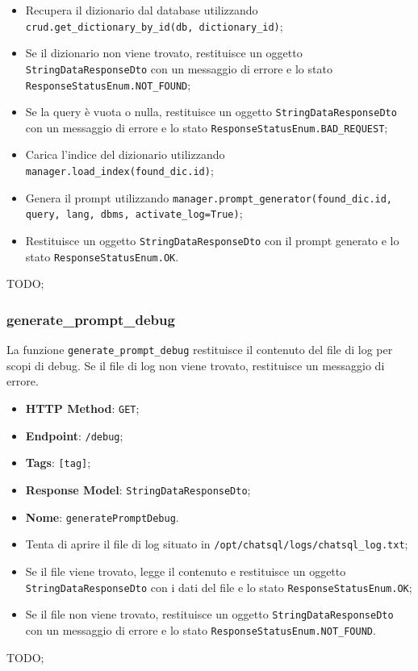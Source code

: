 \begin{itemize}
 \item Recupera il dizionario dal database utilizzando \texttt{crud.get\_dictionary\_by\_id(db, dictionary\_id)};
 \item Se il dizionario non viene trovato, restituisce un oggetto \texttt{StringDataResponseDto} con un messaggio di errore e lo stato \texttt{ResponseStatusEnum.NOT\_FOUND};
 \item Se la query è vuota o nulla, restituisce un oggetto \texttt{StringDataResponseDto} con un messaggio di errore e lo stato \texttt{ResponseStatusEnum.BAD\_REQUEST};
 \item Carica l'indice del dizionario utilizzando \texttt{manager.load\_index(found\_dic.id)};
 \item Genera il prompt utilizzando \texttt{manager.prompt\_generator(found\_dic.id, query, lang, dbms, activate\_log=True)};
 \item Restituisce un oggetto \texttt{StringDataResponseDto} con il prompt generato e lo stato \texttt{ResponseStatusEnum.OK}.
\end{itemize}

\par TODO;

\subsubsection{generate\_prompt\_debug}

\par La funzione \texttt{generate\_prompt\_debug} restituisce il contenuto del file di log per scopi di debug. Se il file di log non viene trovato, restituisce un messaggio di errore.

\begin{itemize}
 \item \textbf{HTTP Method}: \texttt{GET};
 \item \textbf{Endpoint}: \texttt{/debug};
 \item \textbf{Tags}: \texttt{[tag]};
 \item \textbf{Response Model}: \texttt{StringDataResponseDto};
 \item \textbf{Nome}: \texttt{generatePromptDebug}.
\end{itemize}

\begin{itemize}
 \item Tenta di aprire il file di log situato in \texttt{/opt/chatsql/logs/chatsql\_log.txt};
 \item Se il file viene trovato, legge il contenuto e restituisce un oggetto \texttt{StringDataResponseDto} con i dati del file e lo stato \texttt{ResponseStatusEnum.OK};
 \item Se il file non viene trovato, restituisce un oggetto \texttt{StringDataResponseDto} con un messaggio di errore e lo stato \texttt{ResponseStatusEnum.NOT\_FOUND}.
\end{itemize}

\par TODO;